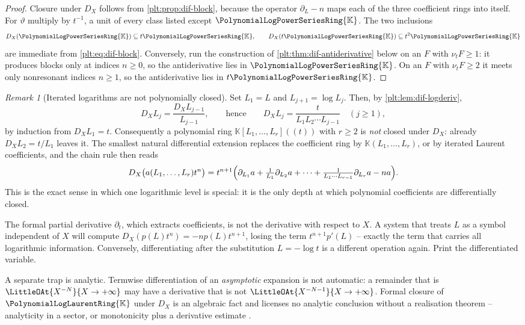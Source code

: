 \documentclass[11pt,oneside]{article}
\theoremstyle{plain}
\theoremstyle{definition}
\theoremstyle{remark}
\newtheorem{remark}[theorem]{Remark}
\newcommand{\K}{\mathbb{K}}
\newcommand{\PLpow}{\PolynomialLogPowerSeriesRing{\K}}   %
\newcommand{\PLlau}{\PolynomialLogLaurentRing{\K}}       %
\newcommand{\ordt}{\nu_{t}}                              %
\newcommand{\DX}{D_{X}}                                  %
\newcommand{\EulerOp}{\vartheta}                         %
\begin{document}
\begin{proof}
Closure under \(\DX\) follows from \cref{plt:prop:dif-block}, because the
operator \(\partial_{L}-n\) maps each of the three coefficient rings into
itself.  For \(\EulerOp\) multiply by \(t^{-1}\), a unit of every class listed
except \(\PLpow\).  The two inclusions
\[
  \DX(\PLpow)\subseteq t\PLpow,
  \qquad
  \DX(t\PLpow)\subseteq t^{2}\PLpow
\]
are immediate from \cref{plt:eq:dif-block}.  Conversely, run the construction
of \cref{plt:thm:dif-antiderivative} below on an \(F\) with \(\ordt F\ge1\):
it produces blocks only at indices \(n\ge0\), so the antiderivative lies in
\(\PLpow\).  On an \(F\) with \(\ordt F\ge2\) it meets only nonresonant
indices \(n\ge1\), so the antiderivative lies in \(t\PLpow\).
\end{proof}

\begin{remark}[Iterated logarithms are not polynomially closed]
\label{plt:rmk:dif-tower}
Set \(L_{1}=L\) and \(L_{j+1}=\log L_{j}\).  Then, by
\cref{plt:lem:dif-logderiv},
\begin{equation}\label{plt:eq:dif-tower}
  \DX L_{j}=\frac{\DX L_{j-1}}{L_{j-1}},
  \qquad\text{hence}\qquad
  \DX L_{j}=\frac{t}{L_{1}L_{2}\cdots L_{j-1}}
  \quad (j\ge1),
\end{equation}
by induction from \(\DX L_{1}=t\).  Consequently a polynomial ring
\(\K[L_{1},\dots,L_{r}]((t))\) with \(r\ge2\) is \emph{not} closed under
\(\DX\): already \(\DX L_{2}=t/L_{1}\) leaves it.  The smallest natural
differential extension replaces the coefficient ring by
\(\K(L_{1},\dots,L_{r})\), or by iterated Laurent coefficients, and the chain
rule then reads
\[
  \DX\bigl(a(L_{1},\dots,L_{r})t^{n}\bigr)
  =t^{n+1}\Bigl(\partial_{L_{1}}a
   +\tfrac{1}{L_{1}}\partial_{L_{2}}a+\cdots
   +\tfrac{1}{L_{1}\cdots L_{r-1}}\partial_{L_{r}}a-na\Bigr).
\]
This is the exact sense in which one logarithmic level is special: it is the
only depth at which polynomial coefficients are differentially closed.
\end{remark}

\begin{warningbox}
The formal partial derivative \(\partial_{t}\), which extracts coefficients, is
not the derivative with respect to \(X\).  A system that treats \(L\) as a
symbol independent of \(X\) will compute
\(\DX(p(L)t^{n})=-np(L)t^{n+1}\), losing the term \(t^{n+1}p'(L)\) -- exactly
the term that carries all logarithmic information.  Conversely, differentiating
after the substitution \(L=-\log t\) is a different operation again.  Print the
differentiated variable.

A separate trap is analytic.  Termwise differentiation of an \emph{asymptotic}
expansion is not automatic: a remainder that is \(\LittleOAt{X^{-N}}{X\to
+\infty}\) may have a derivative that is not \(\LittleOAt{X^{-N-1}}{X\to
+\infty}\).  Formal closure of \(\PLlau\) under \(\DX\) is an algebraic fact
and licenses no analytic conclusion without a realisation theorem --
analyticity in a sector, or monotonicity plus a derivative estimate
\cite{olver-asymptotics,hardy-orders}.
\end{warningbox}
\end{document}
